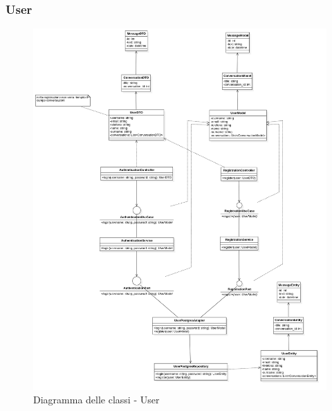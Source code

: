     \subsubsection{User}

    \begin{figure}[H]
        \centering
        \includegraphics[width=\linewidth, height=0.8\textheight, keepaspectratio]{./img/png/Model5!User_5.png}
        \caption{Diagramma delle classi - User}
        \label{fig:user}
    \end{figure}

